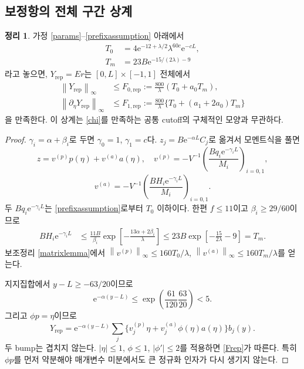\documentclass[11pt,a4paper]{article}
\theoremstyle{definition}
\newtheorem{theorem}{정리}[section]
\theoremstyle{remark}\newtheorem{remark}[theorem]{주의}
\newcommand{\norm}[1]{\left\lVert #1\right\rVert}
\newcommand{\e}{\mathrm e}
\newcommand{\rep}{\mathrm{rep}}
\begin{document}
\subsection{보정항의 전체 구간 상계}
\begin{theorem}\label{repairtheorem}
가정 \eqref{params}--\eqref{prefixassumption} 아래에서
\begin{align}\label{Ts}
 T_0&=4\e^{-12+\lambda/2}\lambda^{60c}\e^{-cL},\\
 T_m&=23B\e^{-15/(2\lambda)-9}\nonumber
\end{align}
라고 놓으면, $Y_\rep=Er$는 $[0,L]\times[-1,1]$ 전체에서
\begin{align}\label{Frep}
 \norm{Y_\rep}_\infty&\le F_{0,\rep}:=\frac{800}{\lambda}(T_0+a_0T_m),\\
 \norm{\partial_\eta Y_\rep}_\infty&\le F_{1,\rep}:=
 \frac{800}{\lambda}\{T_0+(a_1+2a_0)T_m\}\nonumber
\end{align}
을 만족한다. 이 상계는 \eqref{chi}를 만족하는 공통 cutoff의 구체적인 모양과 무관하다.
\end{theorem}
\begin{proof}
$\gamma_i=\alpha+\beta_i$로 두면 $\gamma_0=1$, $\gamma_1=c$다. $z_j=B\e^{-\alpha L}C_j$로 옮겨서 모멘트식을 풀면
\begin{equation}
 z=v^{(p)}p(\eta)+v^{(a)}a(\eta),\quad
 v^{(p)}=-V^{-1}\left(\frac{Bq_i\e^{-\gamma_i L}}{M_i}\right)_{i=0,1},
\end{equation}
\begin{equation}
 v^{(a)}=-V^{-1}\left(\frac{BH_i\e^{-\gamma_i L}}{M_i}\right)_{i=0,1}.
\end{equation}
두 $Bq_i\e^{-\gamma_iL}$는 \eqref{prefixassumption}로부터 $T_0$ 이하이다. 한편 $f\le11$이고 $\beta_i\ge29/60$이므로
\begin{align}
 BH_i\e^{-\gamma_iL}
 &\le\frac{11B}{\beta_i}
       \exp\left[-\frac{13\alpha+2\beta_i}{\lambda}\right]
 \le 23B\exp\left[-\frac{15}{2\lambda}-9\right]=T_m.
\end{align}
보조정리 \ref{matrixlemma}에서
$\norm{v^{(p)}}_\infty\le160T_0/\lambda$,
$\norm{v^{(a)}}_\infty\le160T_m/\lambda$를 얻는다.

지지집합에서 $y-L\ge-63/20$이므로
\begin{equation}
 \e^{-\alpha(y-L)}\le\exp\left(\frac{61}{120}\frac{63}{20}\right)<5.
\end{equation}
그리고 $\phi p=\eta$이므로
\begin{equation}
 Y_\rep=\e^{-\alpha(y-L)}\sum_j
 \{v^{(p)}_j\eta+v^{(a)}_j\phi(\eta)a(\eta)\}b_j(y).
\end{equation}
두 bump는 겹치지 않는다. $|\eta|\le1$, $\phi\le1$, $|\phi'|\le2$를 적용하면 \eqref{Frep}가 따른다. 특히 $\phi p$를 먼저 약분해야 매개변수 미분에서도 큰 정규화 인자가 다시 생기지 않는다.
\end{proof}
\end{document}
